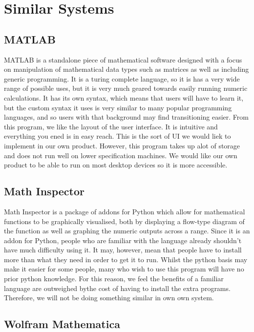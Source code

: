 \documentclass[a4paper, oneside, 11pt]{report}
\begin{document}
\section{Similar Systems}

\subsection{MATLAB\cite{MATLAB}}

MATLAB is a standalone piece of mathematical software designed with a focus on manipulation of mathematical data types such as matrices as well as including generic programming. 
It is a turing complete language, so it is has a very wide range of possible uses, but it is very much geared towards easily running numeric calculations. It has its own syntax,
which means that users will have to learn it, but the custom syntax it uses is very similar to many popular programming languages, and so users with that background may find transitioning easier.
From this program, we like the layout of the user interface. It is intuitive and everything you ened is in easy reach. This is the sort of UI we would liek to implement in our own product.
However, this program takes up alot of storage and does not run well on lower specification machines. We would like our own product to be able to run on most desktop devices so it is more accessible.

\subsection{Math Inspector\cite{Math_Inspector}}

Math Inspector is a package of addons for Python which allow for mathematical functions to be graphically visualised, both by displaying a flow-type diagram of the function as well as graphing the numeric outputs across a range.
 Since it is an addon for Python, people who are familiar with the language already shouldn't have much difficulty using it. It may, however, mean that people have to install more than what they need in order to get it to run.
Whilst the python basis may make it easier for some people, many who wish to use this program will have no prior python knowledge. For this reason, we feel the benefits of a familiar language are outweighed bythe cost of having to install the extra programs. Therefore, we will not be doing something similar in own own system.

\subsection{Wolfram Mathematica\cite{Mathematica}}
\end{document}
